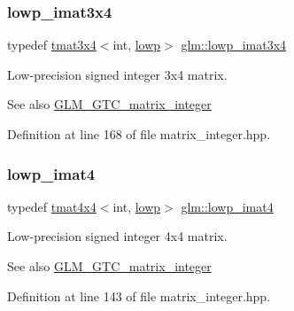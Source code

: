 \subsubsection{\texorpdfstring{lowp\_imat3x4}{lowp\_imat3x4}}
{\footnotesize\ttfamily typedef \mbox{\hyperlink{structglm_1_1tmat3x4}{tmat3x4}}$<$int, \mbox{\hyperlink{namespaceglm_a0f04f086094c747d227af4425893f545ae161af3fc695e696ce3bf69f7332bc2d}{lowp}}$>$ \mbox{\hyperlink{group__gtc__matrix__integer_ga61fe3487c1f4f10fb0f5c9fa0873a694}{glm\+::lowp\+\_\+imat3x4}}}

Low-\/precision signed integer 3x4 matrix. \begin{DoxySeeAlso}{See also}
\mbox{\hyperlink{group__gtc__matrix__integer}{G\+L\+M\+\_\+\+G\+T\+C\+\_\+matrix\+\_\+integer}} 
\end{DoxySeeAlso}


Definition at line 168 of file matrix\+\_\+integer.\+hpp.

\mbox{\label{group__gtc__matrix__integer_gad9a60f2ee78750d31b129c01096751b6}} 
\subsubsection{\texorpdfstring{lowp\_imat4}{lowp\_imat4}}
{\footnotesize\ttfamily typedef \mbox{\hyperlink{structglm_1_1tmat4x4}{tmat4x4}}$<$int, \mbox{\hyperlink{namespaceglm_a0f04f086094c747d227af4425893f545ae161af3fc695e696ce3bf69f7332bc2d}{lowp}}$>$ \mbox{\hyperlink{group__gtc__matrix__integer_gad9a60f2ee78750d31b129c01096751b6}{glm\+::lowp\+\_\+imat4}}}

Low-\/precision signed integer 4x4 matrix. \begin{DoxySeeAlso}{See also}
\mbox{\hyperlink{group__gtc__matrix__integer}{G\+L\+M\+\_\+\+G\+T\+C\+\_\+matrix\+\_\+integer}} 
\end{DoxySeeAlso}


Definition at line 143 of file matrix\+\_\+integer.\+hpp.

\mbox{\label{group__gtc__matrix__integer_ga87e2118b22cbc6916805aafcda52a943}} 
